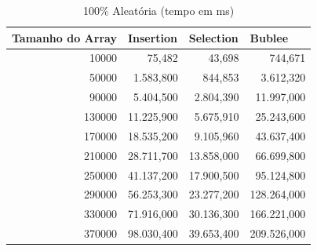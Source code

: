 \documentclass[a4paper, 12pt]{article}
\begin{document}
\begin{longtable}[c]{rrrr}
	\caption{100\% Aleatória (tempo em ms)}
	\label{tab:aleatoria1-table}\\
	\hline
	\multicolumn{1}{l}{\textbf{Tamanho do Array}} & \multicolumn{1}{l}{\textbf{Insertion}} & \multicolumn{1}{l}{\textbf{Selection}} & \multicolumn{1}{l}{\textbf{Bublee}} \\ \hline
	\endfirsthead
	\endhead
	\multicolumn{1}{|r|}{10000}                   & \multicolumn{1}{r|}{75,482}            & \multicolumn{1}{r|}{43,698}            & \multicolumn{1}{r|}{744,671}        \\ \hline
	\multicolumn{1}{|r|}{50000}                   & \multicolumn{1}{r|}{1.583,800}         & \multicolumn{1}{r|}{844,853}           & \multicolumn{1}{r|}{3.612,320}      \\ \hline
	\multicolumn{1}{|r|}{90000}                   & \multicolumn{1}{r|}{5.404,500}         & \multicolumn{1}{r|}{2.804,390}         & \multicolumn{1}{r|}{11.997,000}     \\ \hline
	\multicolumn{1}{|r|}{130000}                  & \multicolumn{1}{r|}{11.225,900}        & \multicolumn{1}{r|}{5.675,910}         & \multicolumn{1}{r|}{25.243,600}     \\ \hline
	\multicolumn{1}{|r|}{170000}                  & \multicolumn{1}{r|}{18.535,200}        & \multicolumn{1}{r|}{9.105,960}         & \multicolumn{1}{r|}{43.637,400}     \\ \hline
	\multicolumn{1}{|r|}{210000}                  & \multicolumn{1}{r|}{28.711,700}        & \multicolumn{1}{r|}{13.858,000}        & \multicolumn{1}{r|}{66.699,800}     \\ \hline
	\multicolumn{1}{|r|}{250000}                  & \multicolumn{1}{r|}{41.137,200}        & \multicolumn{1}{r|}{17.900,500}        & \multicolumn{1}{r|}{95.124,800}     \\ \hline
	\multicolumn{1}{|r|}{290000}                  & \multicolumn{1}{r|}{56.253,300}        & \multicolumn{1}{r|}{23.277,200}        & \multicolumn{1}{r|}{128.264,000}    \\ \hline
	\multicolumn{1}{|r|}{330000}                  & \multicolumn{1}{r|}{71.916,000}        & \multicolumn{1}{r|}{30.136,300}        & \multicolumn{1}{r|}{166.221,000}    \\ \hline
	\multicolumn{1}{|r|}{370000}                  & \multicolumn{1}{r|}{98.030,400}        & \multicolumn{1}{r|}{39.653,400}        & \multicolumn{1}{r|}{209.526,000}    \\ \hline

\end{longtable}
\end{document}
